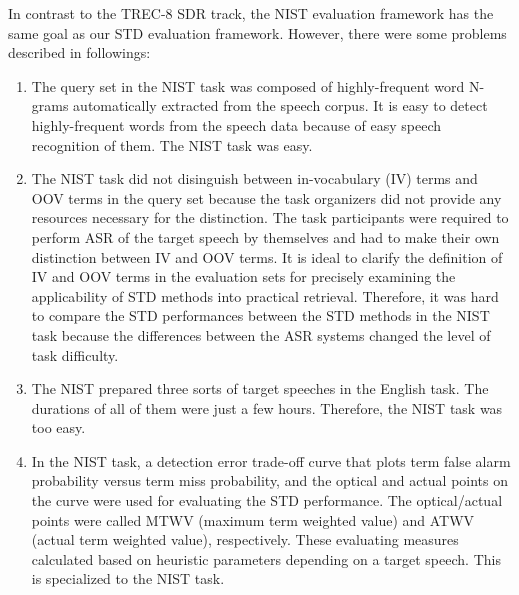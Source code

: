 \documentclass[english]{jnlp_1.4}
\begin{document}
In contrast to the TREC-8 SDR track, the NIST evaluation framework has 
the same goal as our STD evaluation framework. However, there were some 
problems described in followings:
\begin{enumerate}
\item The query set in the NIST task was composed of highly-frequent
      word N-grams automatically extracted from the speech corpus. It is
      easy to detect highly-frequent words from the speech data because
      of easy speech recognition of them. The NIST task was easy.

\item The NIST task did not disinguish between in-vocabulary (IV) terms
      and OOV terms in the query set because the task organizers did not 
      provide any resources necessary for the distinction.
      The task participants were required to perform ASR of the target 
      speech by themselves and had to make their own distinction 
      between IV and OOV terms.
      It is ideal to clarify the definition of IV and OOV terms in the 
      evaluation sets for precisely examining the applicability of 
      STD methods into practical retrieval.
      Therefore, it was hard to compare the STD performances between 
      the STD methods in the NIST task because 
      the differences between the ASR systems changed the level of 
      task difficulty. 

\item  The NIST prepared three sorts of target speeches in the English task.
       The durations of all of them were just a few hours.
       Therefore, the NIST task was too easy. 

\item In the NIST task, a detection error trade-off curve that plots
      term false alarm probability versus term miss probability, and the
      optical and actual points on the curve were used for evaluating
      the STD performance. The optical/actual points were called MTWV
      (maximum term weighted value) and ATWV (actual term weighted
      value), respectively. These evaluating measures calculated based on
      heuristic parameters depending on a target speech. This is
      specialized to the NIST task.
\end{enumerate}
\end{document}
